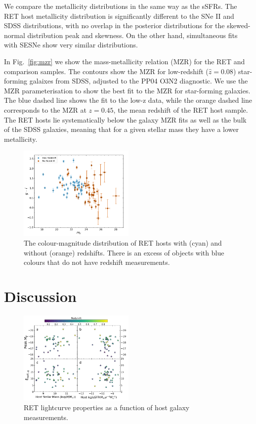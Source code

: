 \documentclass[fleqn,usenatbib,]{mnras}
\begin{document}
We compare the metallicity distributions in the same way as the sSFRs. The RET host metallicity distribution is significantly different to the SNe II and SDSS distributions, with no overlap in the posterior distributions for the skewed-normal distribution peak and skewness. On the other hand, simultaneous fits with SESNe show very similar distributions.

In Fig.~\ref{fig:mzr} we show the mass-metallicity relation (MZR) for the RET and comparison samples. The contours show the MZR for low-redshift ($\hat{z}=0.08$) star-forming galaixes from SDSS, adjusted to the PP04 O3N2 diagnostic. We use the MZR parameterisation \citet{Zahid2014} to show the best fit to the MZR for star-forming galaxies. The blue dashed line shows the fit to the low-z data, while the orange dashed line corresponds to the MZR at $z=0.45$, the mean redshift of the RET host sample. The RET hosts lie systematically below the galaxy MZR fits as well as the bulk of the SDSS galaxies, meaning that for a given stellar mass they have a lower metallicity.

\begin{figure}
\includegraphics[width=0.5\textwidth]{figs/mag_v_colour.png}
\caption{The colour-magnitude distribution of RET hosts with (cyan) and without (orange) redshifts. There is an excess of objects with blue colours that do not have redshift measurements.
\label{fig:g-i}}
\end{figure}

\section{Discussion \label{sec:disc}}
\begin{figure}
\includegraphics[width=0.5\textwidth]{figs/RET_vs_host.png}
\caption{RET lightcurve properties as a function of host galaxy measurements.
\label{fig:ret_v_host}}
\end{figure}
\end{document}
